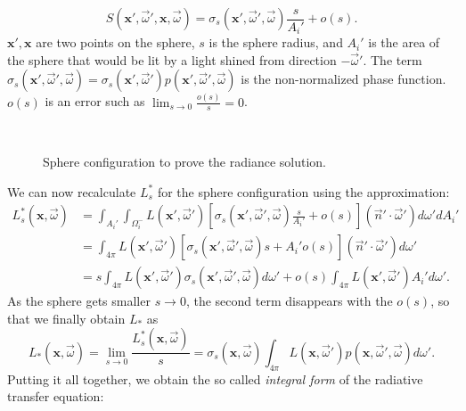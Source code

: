 \begin{equation*}
S(\mathbf{x}', \vec{\omega}', \mathbf{x}, \vec{\omega}) = \sigma_s(\mathbf{x}', \vec{\omega}', \vec{\omega}) \frac{s}{A_i'} + o(s).
\end{equation*}
$\mathbf{x}', \mathbf{x}$ are two points on the sphere, $s$ is the sphere radius, and $A_i'$ is the area of the sphere that would be lit by a light shined from direction $-\vec{\omega}'$. The term $\sigma_s(\mathbf{x}', \vec{\omega}', \vec{\omega}) = \sigma_s(\mathbf{x}', \vec{\omega}') p(\mathbf{x}', \vec{\omega}', \vec{\omega})$ is the non-normalized phase function. $o(s)$ is an error such as $\lim_{s\rightarrow 0} \frac{o(s)}{s} = 0$.
%
\begin{figure}
\centering
   \def\svgwidth{0.8\textwidth}
    \\
\caption{Sphere configuration to prove the radiance solution.} %
\label{fig:sphere}
\end{figure}
%
We can now recalculate $L_s^*$ {for the sphere configuration} using the approximation:
\begin{equation}
\begin{split}
L_s^*(\mathbf{x}, \vec{\omega}) &= \int_{A_i'} \int_{\Omega^-_i} L(\mathbf{x}', \vec{\omega}')  [\sigma_s(\mathbf{x}', \vec{\omega}', \vec{\omega}) \frac{s}{A_i'} + o(s)] (\vec{n}' \cdot \vec{\omega}') d\omega' dA_i'  \\
&= \int_{4\pi}  L(\mathbf{x}', \vec{\omega}')  [\sigma_s(\mathbf{x}', \vec{\omega}', \vec{\omega}) s + A_i' o(s)] (\vec{n}' \cdot \vec{\omega}') d\omega'\\
&= s \int_{4\pi}  L(\mathbf{x}', \vec{\omega}')  \sigma_s(\mathbf{x}', \vec{\omega}', \vec{\omega}) d\omega' + o(s) \int_{4\pi}  L(\mathbf{x}', \vec{\omega}') A_i'   d\omega'.
\end{split}
\end{equation}
As the sphere gets smaller $s\rightarrow 0$, the second term disappears with the $o(s)$, so that we finally obtain $L_*$ as
\begin{equation}
\label{eq:lstar}
L_*(\mathbf{x}, \vec{\omega}) = \lim_{s\rightarrow 0} \frac{L_s^*(\mathbf{x}, \vec{\omega})}{s} = \sigma_s(\mathbf{x}, \vec{\omega}) \int_{4\pi} L(\mathbf{x}, \vec{\omega}') p(\mathbf{x}, \vec{\omega}', \vec{\omega})   d\omega'.
\end{equation}
Putting it all together, we obtain the so called \emph{integral form} of the radiative transfer equation:
